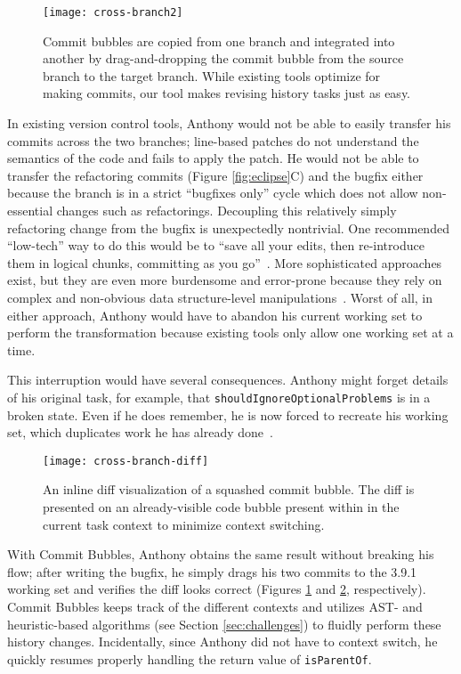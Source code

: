 \documentclass[conference]{IEEEtran}
\begin{document}
\begin{figure}[h]
\centering
\texttt{[image: cross-branch2]}
\caption{Commit bubbles are copied from one branch and integrated into another by drag-and-dropping the commit bubble from the source branch to the target branch.
While existing tools optimize for making commits, our tool makes revising history tasks just as easy.
}
\label{fig:cross-branch}
\end{figure}
In existing version control tools, Anthony would not be able to easily transfer his commits across the two branches;
line-based patches do not understand the semantics of the code and fails to apply the patch.
He would not be able to transfer the refactoring commits (Figure \ref{fig:eclipse}C) and the bugfix either because the branch is in a strict ``bugfixes only'' cycle which does not allow non-essential changes such as refactorings.
Decoupling this relatively simply refactoring change from the bugfix is unexpectedly nontrivial.
One recommended ``low-tech'' way to do this would be to ``save all your edits, then re-introduce them in logical chunks, committing as you go''~\cite{GitBestPractices}.
More sophisticated approaches exist, but they are even more burdensome and error-prone because they rely on complex and non-obvious data structure-level manipulations~\cite{SausageMaking}.
Worst of all, in either approach, Anthony would have to abandon his current working set to perform the transformation because existing tools only allow one working set at a time.

This interruption would have several consequences.
Anthony might forget details of his original task, for example, that \texttt{shouldIgnoreOptionalProblems} is in a broken state.
Even if he does remember, he is now forced to recreate his working set, which duplicates work he has already done~\cite{Ko2006}.

\begin{figure}
\centering
\texttt{[image: cross-branch-diff]}
\caption{An inline diff visualization of a squashed commit bubble. The diff is presented on an already-visible code bubble present within in the current task context to minimize context switching.}
\label{fig:diff}
\end{figure}

With Commit Bubbles, Anthony obtains the same result without breaking his flow; after writing the bugfix, he simply drags his two commits to the 3.9.1 working set and verifies the diff looks correct (Figures \ref{fig:cross-branch} and \ref{fig:diff}, respectively).
Commit Bubbles keeps track of the different contexts and utilizes AST- and heuristic-based algorithms (see Section \ref{sec:challenges}) to fluidly perform these history changes.
Incidentally, since Anthony did not have to context switch, he quickly resumes properly handling the return value of \texttt{isParentOf}.
\end{document}
